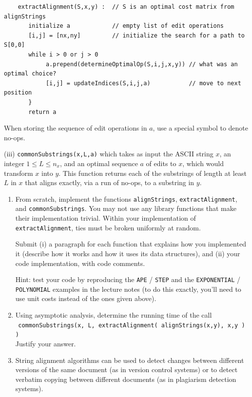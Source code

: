 \documentclass[12pt]{article}
\begin{document}
\begin{enumerate}
	\begin{small}
	\begin{verbatim}
	extractAlignment(S,x,y) :  // S is an optimal cost matrix from alignStrings
	   initialize a            // empty list of edit operations
	   [i,j] = [nx,ny]         // initialize the search for a path to S[0,0]
	   while i > 0 or j > 0
	        a.prepend(determineOptimalOp(S,i,j,x,y)) // what was an optimal choice?
	        [i,j] = updateIndices(S,i,j,a)           // move to next position
	   }
	   return a
	\end{verbatim}
	\end{small}
	
	When storing the sequence of edit operations in $a$, use a special symbol to denote no-ops.
	
	(iii) {\tt commonSubstrings(x,L,a)} which takes as input the ASCII string $x$, an integer $1\leq L \leq n_{x}$, and an optimal sequence $a$ of edits to $x$, which would transform $x$ into $y$. This function returns each of the substrings of length at least $L$ in $x$ that aligns exactly, via a run of no-ops, to a substring in $y$.

	\begin{enumerate}

	\item From scratch, implement the functions {\tt alignStrings}, {\tt extractAlignment}, and {\tt commonSubstrings}. You may not use any library functions that make their implementation trivial. Within your implementation of {\tt extractAlignment}, ties must be broken uniformly at random.
	
	Submit (i) a paragraph for each function that explains how you implemented it (describe how it works and how it uses its data structures), and (ii) your code implementation, with code comments. \label{q:align:code}
	
	Hint: test your code by reproducing the {\tt APE} / {\tt STEP} and the {\tt EXPONENTIAL} / {\tt POLYNOMIAL} examples in the lecture notes (to do this exactly, you'll need to use unit costs instead of the ones given above).
	
	\item Using asymptotic analysis, determine the running time of the call \\ ${}^{}$\hspace{0mm} {\tt commonSubstrings(x, L, extractAlignment(  alignStrings(x,y), x,y  )  )} \\
	Justify your answer.
	
	\item String alignment algorithms can be used to detect changes between different versions of the same document (as in version control systems) or to detect verbatim copying between different documents (as in plagiarism detection systems).
	

\end{enumerate}
\end{enumerate}
\end{document}
